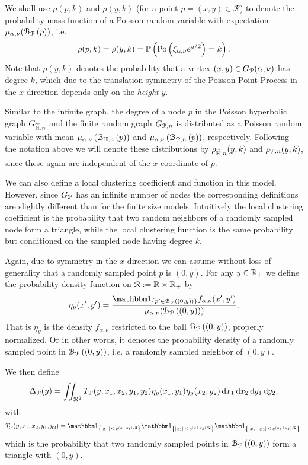 We shall use $\rho(p,k)$ and $\rho(y,k)$ (for a point $p=(x,y) \in \mathcal{R}$) to denote the probability mass function of a Poisson random variable with expectation $\mu_{\alpha, \nu}({\mathcal B}_{{\mathcal P}}\left(p\right))$, i.e.
\[
	\rho(p,k) = \rho(y,k) = \mathbb{P}\left({\mathrm{Po}}\left(\xi_{\alpha,\nu} e^{y/2}\right) = k\right).
\]
Note that $\rho(y,k)$ denotes the probability that a vertex $(x,y) \in G_{{\mathcal P}}(\alpha,\nu)$ has degree $k$, which due to the translation symmetry of the Poisson Point Process in the $x$ direction depends only on the \emph{height} $y$.

\begin{remark}
Similar to the infinite graph, the degree of a node $p$ in the Poisson hyperbolic graph $G_{\widetilde{\mathbb{H}},n}$ and the finite random graph $G_{{\mathcal P},n}$ is distributed as a Poisson random variable with mean $\mu_{\alpha,\nu}\left({\mathcal B}_{\mathbb{H},n}\left(p\right)\right)$ and $\mu_{\alpha,\nu}\left({\mathcal B}_{{\mathcal P},n}\left(p\right)\right)$, respectively. Following the notation above we will denote these distributions by $\rho_{\widetilde{\mathbb{H}},n}(y,k)$ and $\rho_{{\mathcal P},n}(y,k)$, since these again are independent of the $x$-coordinate of $p$.
\end{remark}

We can also define a local clustering coefficient and function in this model. However, since $G_{{\mathcal P}}$ has an infinite number of nodes the corresponding definitions are slightly different than for the finite size models. Intuitively the local clustering coefficient is the probability that two random neighbors of a randomly sampled node form a triangle, while the local clustering function is the same probability but conditioned on the sampled node having degree $k$.

Again, due to symmetry in the $x$ direction we can assume without loss of generality that a randomly sampled point $p$ is $(0,y)$. For any $y \in {\ensuremath{\mathbb R}}_+$ we define the probability density function on ${\mathcal R} :=  {\mathbb R} \times {\ensuremath{\mathbb R}}_+$ by  
\begin{equation}\label{eq:def_eta_P}
	\eta_y(x^\prime, y^\prime) = \frac{\ind{p^\prime \in \BallPo{(0,y)}} f_{\alpha,\nu}(x^\prime,y^\prime)}{\mu_{\alpha,\nu}(\BallPo{(0,y)})}.
\end{equation}
That is $\eta_y$ is the density $f_{\alpha,\nu}$ restricted to the ball ${\mathcal B}_{{\mathcal P}}\left((0,y)\right)$, properly normalized. Or in other words, it denotes the probability density of a randomly sampled point in ${\mathcal B}_{{\mathcal P}}\left((0,y)\right)$, i.e. a randomly sampled neighbor of $(0,y)$. 

We then define
\begin{equation}\label{eq:def_delta_p}
	\Delta_{{\mathcal P}}(y) = \iint_{{\mathcal R}^2} T_{{\mathcal P}}(y, x_1, x_2, y_1, y_2) \eta_{y}(x_1,y_1)\eta_{y}(x_2,y_2) \operatorname{\mathrm{d}\hspace{-2pt}} x_1 \operatorname{\mathrm{d}\hspace{-2pt}} x_2  \operatorname{\mathrm{d}\hspace{-2pt}} y_1  \operatorname{\mathrm{d}\hspace{-2pt}} y_2,
\end{equation}
with 
\[
	T_\Pcal(y, x_1, x_2, y_1, y_2) 
	= \ind{|x_1| \, \le \, e^{(y+y_1)/2}}\ind{|x_2| \, \le \, e^{(y+y_2)/2}}\ind{|x_1-x_2| \, \le \, e^{(y_1+y_2)/2}},
\]
which is the probability that two randomly sampled points in ${\mathcal B}_{{\mathcal P}}\left((0,y)\right)$ form a triangle with $(0,y)$.

